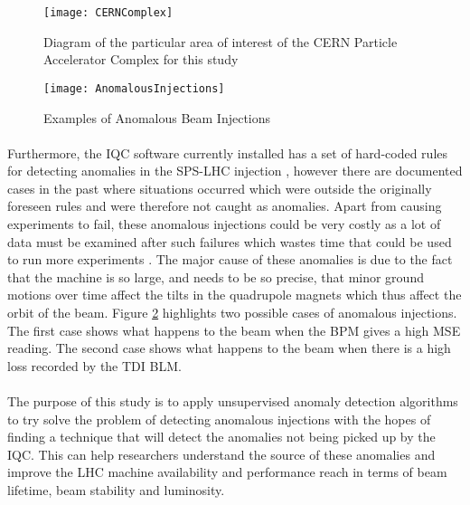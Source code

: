 \begin{figure}[t]
	\centering
	\texttt{[image: CERNComplex]}
	\caption[The CERN Particle Accelerator Complex]{Diagram of the particular area of interest of the CERN Particle Accelerator Complex for this study}
	\label{fig::SPStoLHCInjection}
\end{figure}

\begin{figure}[b]
	\centering
	\texttt{[image: AnomalousInjections]}
	\caption[Anomalous Injections]{Examples of Anomalous Beam Injections}
	\label{fig::AnomalousInjections}
\end{figure}

\paragraph{ }Furthermore, the \ac{IQC} software currently installed has a set of hard-coded rules for detecting anomalies in the \acs{SPS}-\acs{LHC} injection \cite{Drosdal2011}, however there are documented cases in the past where situations occurred which were outside the originally foreseen rules and were therefore not caught as anomalies. Apart from causing experiments to fail, these anomalous injections could be very costly as a lot of data must be examined after such failures which wastes time that could be used to run more experiments \cite{Halilovic2018}. The major cause of these anomalies is due to the fact that the machine is so large, and needs to be so precise, that minor ground motions over time affect the tilts in the quadrupole magnets which thus affect the orbit of the beam. Figure \ref{fig::AnomalousInjections} highlights two possible cases of anomalous injections. The first case shows what happens to the beam when the \acs{BPM} gives a high \ac{MSE} reading. The second case shows what happens to the beam when there is a high loss recorded by the \acs{TDI} \acs{BLM}.


\paragraph{ }The purpose of this study is to apply unsupervised anomaly detection algorithms to try solve the problem of detecting anomalous injections with the hopes of finding a technique that will detect the anomalies not being picked up by the \acs{IQC}. This can help researchers understand the source of these anomalies and improve the \acs{LHC} machine availability and performance reach in terms of beam lifetime, beam stability and luminosity.

